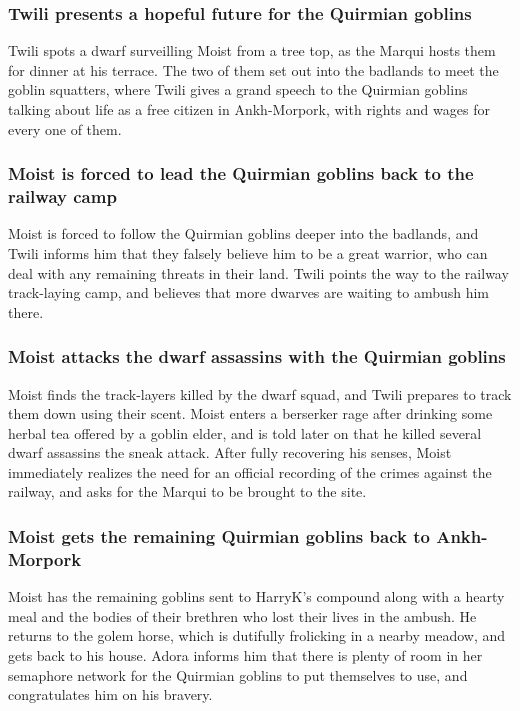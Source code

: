 \subsubsection{\Gls{Twili} presents a hopeful future for the Quirmian goblins}
\Gls{Twili} spots a dwarf surveilling \Gls{Moist} from a tree top, as the \Gls{Marqui} hosts them
for dinner at his terrace. The two of them set out into the badlands to meet the goblin squatters,
where \Gls{Twili} gives a grand speech to the Quirmian goblins talking about life as a free citizen
in Ankh-Morpork, with rights and wages for every one of them.

\subsubsection{\Gls{Moist} is forced to lead the Quirmian goblins back to the railway camp}
\Gls{Moist} is forced to follow the Quirmian goblins deeper into the badlands, and \Gls{Twili}
informs him that they falsely believe him to be a great warrior, who can deal with any remaining
threats in their land. \Gls{Twili} points the way to the railway track-laying camp, and believes
that more dwarves are waiting to ambush him there.

\subsubsection{\Gls{Moist} attacks the dwarf assassins with the Quirmian goblins}
\Gls{Moist} finds the track-layers killed by the dwarf squad, and \Gls{Twili} prepares to track
them down using their scent. \Gls{Moist} enters a berserker rage after drinking some herbal tea
offered by a goblin elder, and is told later on that he killed several dwarf assassins the sneak
attack. After fully recovering his senses, \Gls{Moist} immediately realizes the need for an
official recording of the crimes against the railway, and asks for the \Gls{Marqui} to be brought
to the site.

\subsubsection{\Gls{Moist} gets the remaining Quirmian goblins back to Ankh-Morpork}
\Gls{Moist} has the remaining goblins sent to \Gls{HarryK}'s compound along with a hearty meal and
the bodies of their brethren who lost their lives in the ambush. He returns to the golem horse,
which is dutifully frolicking in a nearby meadow, and gets back to his house. \Gls{Adora} informs
him that there is plenty of room in her semaphore network for the Quirmian goblins to put themselves
to use, and congratulates him on his bravery.

